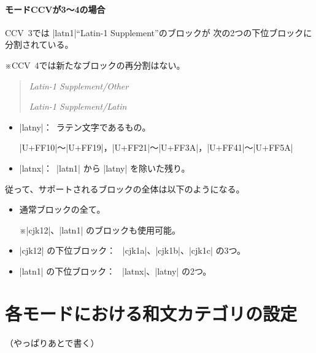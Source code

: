 \documentclass[uplatex,dvipdfmx,a4paper]{jsarticle}
\newcommand{\Note}{\par\noindent ※}
\newcommand{\Means}{：~}
\begin{document}
\paragraph{モードCCVが3～4の場合}

CCV~3では |latn1|“Latin-1 Supplement”のブロックが
次の2つの下位ブロックに分割されている。
\Note CCV~4では新たなブロックの再分割はない。

\begin{quotation}
  \newcommand\xE[2]{\noindent
    \makebox[4em][l]{\texttt{#1}}\textsl{#2}\par}
  \xE{latnx}{Latin-1 Supplement/Other}
  \xE{latny}{Latin-1 Supplement/Latin}
\end{quotation}

\begin{itemize}
\item |latny|\Means ラテン文字であるもの。\par
  |U+FF10|～|U+FF19|，|U+FF21|～|U+FF3A|，|U+FF41|～|U+FF5A|
\item |latnx|\Means |latn1| から |latny| を除いた残り。
\end{itemize}

従って、サポートされるブロックの全体は以下のようになる。

\begin{itemize}
\item 通常ブロックの全て。
  \Note |cjk12|、|latn1| のブロックも使用可能。
\item |cjk12| の下位ブロック\Means
  |cjk1a|、|cjk1b|、|cjk1c| の3つ。
\item |latn1| の下位ブロック\Means
  |latnx|、|latny| の2つ。
\end{itemize}


\section{各モードにおける和文カテゴリの設定}
\label{sec:Values}

（やっぱりあとで書く）
\end{document}
